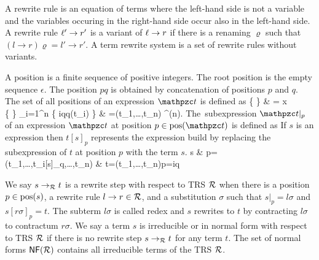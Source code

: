 \begin{definition}
	A {\myem rewrite rule} is an equation of terms where the left-hand side is not a variable
	and the variables occuring in the right-hand side occur also in the left-hand side.
	A rewrite rule $\ell'\rightarrow r'$ is a {\myem variant} of $\ell\rightarrow r$ if there is a renaming $\varrho$
	such that 
	$(l\rightarrow r)\varrho = l'\rightarrow r'$.
	A {\myem term rewrite system} is a set of rewrite rules without variants.
\end{definition}

\begin{definition}\label{def:position}
	A {\myem position} is a finite sequence of positive integers.
	The root position is the empty sequence $\epsilon$.
	The position $pq$ is obtained by concatenation of positions $p$ and $q$.
	The set of all positions of an expression $\mct$ is defined as 
	\DEFINE{ 
		\pos(\mct) }
	{
		\{ \epsilon \} 		
		& \mct = x \in \mcV \\
%		
		\{ \epsilon \} \cup \bigcup_{i=1}^{n} \{ iq\mid q\in\pos(t_i) \}	
		& \mct=\mcf(t_1,\ldots,t_n) \mcf\in\mcF^{(n)}.
	}
The~{\myem subexpression} $\mct|_p$ of an expression $\mct$ {\myem at position} $p\in\pos(\mct)$ is defined as
%
%
If $s$ is an expression then $t[s]_p$ represents the expression build by replacing the subexpression of $t$ at position $p$ with the term $s$.
{
	s 		& p=\epsilon \\
	\mf(t_1,\ldots,t_i[s]_q,\ldots,t_n)	& t=\mf(t_1,\ldots,t_n)p=iq
}
\end{definition}

\begin{definition}
	We say $s\rightarrow_{\mathcal R} t$ is a 
	{\myem rewrite step} 
	 with respect to TRS ${\mathcal R}$ 
	when there is a position $p \in \operatorname{pos}(s)$, 
	a rewrite rule $l\rightarrow r\in{\mathcal R}$, 
	and a substitution $\sigma$ such that
	$s|_p=l\sigma$ and $s[r\sigma]_p = t$.
		The subterm $l\sigma$ is called {\myem redex} and
	$s$ rewrites to $t$ by {\myem contracting} $l\sigma$ to {\myem contractum} $r\sigma$.
	We say a term $s$ is {\myem irreducible} or in {\myem normal form} with respect to TRS ${\mathcal R}$ if there is no rewrite step $s\rightarrow_{\mathcal R} t$ for any term $t$. 
	The set of normal forms $\mathsf{NF}({\mathcal R})$ contains all irreducible terms of the TRS ${\mathcal R}$.
	\end{definition}


